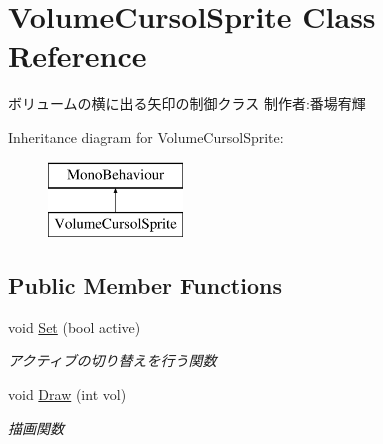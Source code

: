 \hypertarget{class_volume_cursol_sprite}{}\section{Volume\+Cursol\+Sprite Class Reference}
\label{class_volume_cursol_sprite}


ボリュームの横に出る矢印の制御クラス 制作者\+:番場宥輝  


Inheritance diagram for Volume\+Cursol\+Sprite\+:\begin{figure}[H]
\begin{center}
\leavevmode
\includegraphics[height=2.000000cm]{class_volume_cursol_sprite}
\end{center}
\end{figure}
\subsection*{Public Member Functions}
\begin{DoxyCompactItemize}
\item 
void \hyperlink{class_volume_cursol_sprite_a18da757108eb820eb53bfc460693a273}{Set} (bool active)
\begin{DoxyCompactList}\small\item\em アクティブの切り替えを行う関数 \end{DoxyCompactList}\item 
void \hyperlink{class_volume_cursol_sprite_ab8436891aacf087e0e2f0edcd70baa55}{Draw} (int vol)
\begin{DoxyCompactList}\small\item\em 描画関数 \end{DoxyCompactList}\end{DoxyCompactItemize}
